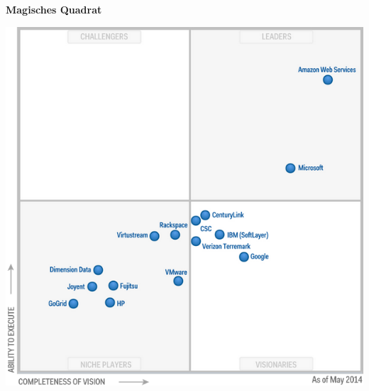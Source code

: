 \documentclass[12pt,a4paper,bibliography=totocnumbered,listof=totocnumbered]{scrartcl}
\begin{document}
\textbf{Magisches Quadrat}
\vspace{1em}
$\;$\\
\begin{minipage}{\linewidth}
	\centering
	\includegraphics[width=0.7\linewidth]{Gartner_Magic_Square.png}
	\label{Gartner}
\end{minipage}
\vspace{1em}
\end{document}
